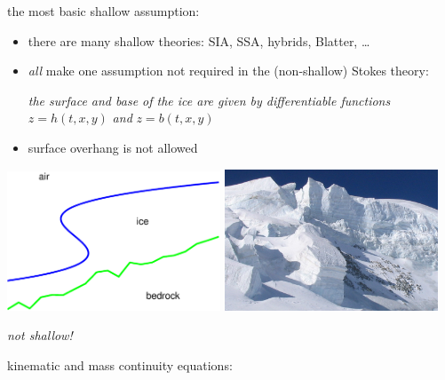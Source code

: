 \documentclass[titlepage,letterpaper,final,12pt]{scrartcl}
\newcommand{\alert}[1]{\emph{#1}}
\begin{document}
the most basic shallow assumption:

\begin{itemize}
\item there are many shallow theories: SIA, SSA, hybrids, Blatter, \dots \nocite{Blatter}
\item \emph{all} make one assumption not required in the (non-shallow) Stokes theory:

\begin{center}
\emph{the surface and base of the ice are given by differentiable functions} $z=h(t,x,y)$ \emph{and} $z=b(t,x,y)$
\end{center}
\item surface overhang is not allowed
\end{itemize}


\begin{center}
\includegraphics[width=2.5in]{sshape}
\quad
\includegraphics[width=2.5in]{Serac2}

\alert{not shallow!}
\end{center}


kinematic and mass continuity equations:
\end{document}

